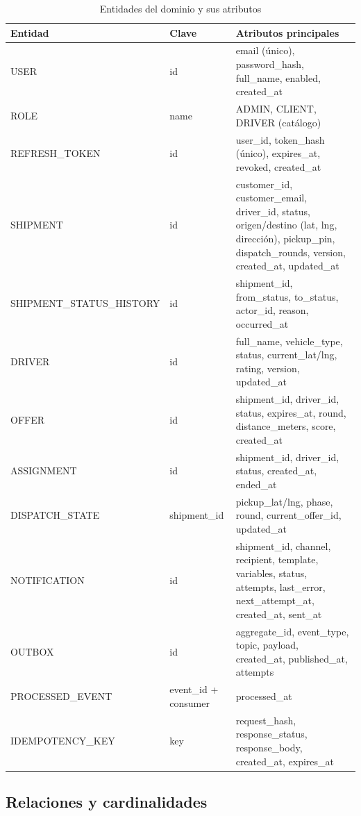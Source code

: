 \documentclass[conference]{IEEEtran}
\begin{document}
\begin{table}[!t]
\centering
\caption{Entidades del dominio y sus atributos}
\label{tab:entidades}
\begin{tabular}{@{}L{4.6cm}L{2.2cm}L{7.2cm}@{}}
\toprule
\textbf{Entidad} & \textbf{Clave} & \textbf{Atributos principales}\\
\midrule
USER & id & email (único), password\_hash, full\_name, enabled, created\_at\\
ROLE & name & ADMIN, CLIENT, DRIVER (catálogo)\\
REFRESH\_TOKEN & id & user\_id, token\_hash (único), expires\_at, revoked, created\_at\\
SHIPMENT & id & customer\_id, customer\_email, driver\_id, status, origen/destino (lat, lng,
dirección), pickup\_pin, dispatch\_rounds, version, created\_at, updated\_at\\
SHIPMENT\_STATUS\_HISTORY & id & shipment\_id, from\_status, to\_status, actor\_id, reason, occurred\_at\\
DRIVER & id & full\_name, vehicle\_type, status, current\_lat/lng, rating, version, updated\_at\\
OFFER & id & shipment\_id, driver\_id, status, expires\_at, round, distance\_meters, score, created\_at\\
ASSIGNMENT & id & shipment\_id, driver\_id, status, created\_at, ended\_at\\
DISPATCH\_STATE & shipment\_id & pickup\_lat/lng, phase, round, current\_offer\_id, updated\_at\\
NOTIFICATION & id & shipment\_id, channel, recipient, template, variables, status, attempts,
last\_error, next\_attempt\_at, created\_at, sent\_at\\
OUTBOX & id & aggregate\_id, event\_type, topic, payload, created\_at, published\_at, attempts\\
PROCESSED\_EVENT & event\_id + consumer & processed\_at\\
IDEMPOTENCY\_KEY & key & request\_hash, response\_status, response\_body, created\_at, expires\_at\\
\bottomrule
\end{tabular}
\end{table}

\subsection{Relaciones y cardinalidades}
\end{document}
